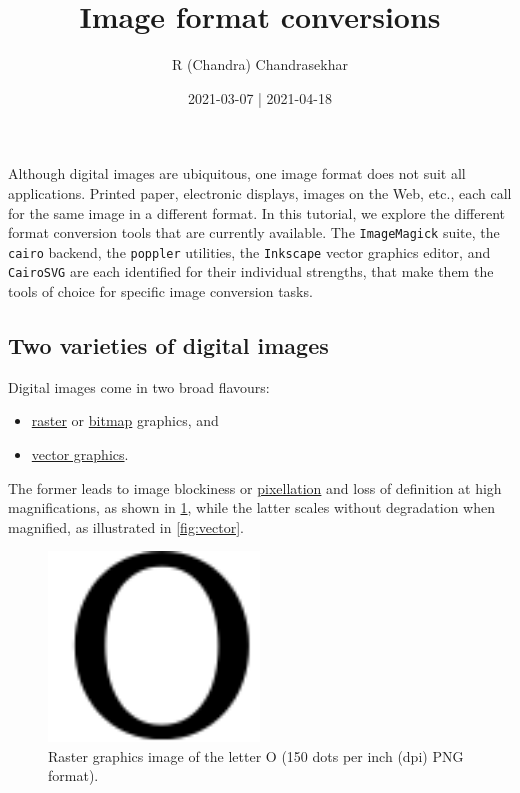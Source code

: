 \documentclass[
  11pt,
  british,
  a4paper,
]{article}
\title{Image format conversions}
\author{R (Chandra) Chandrasekhar}
\date{2021-03-07 | 2021-04-18}
\providecommand{\tightlist}{%
  \setlength{\itemsep}{0pt}\setlength{\parskip}{0pt}}
\begin{document}
\maketitle

\thispagestyle{empty}


Although digital images are ubiquitous, one image format does not suit
all applications. Printed paper, electronic displays, images on the Web,
etc., each call for the same image in a different format. In this
tutorial, we explore the different format conversion tools that are
currently available. The \texttt{ImageMagick} suite, the \texttt{cairo}
backend, the \texttt{poppler} utilities, the \texttt{Inkscape} vector
graphics editor, and \texttt{CairoSVG} are each identified for their
individual strengths, that make them the tools of choice for specific
image conversion tasks.

\hypertarget{two-varieties-of-digital-images}{%
\subsection{Two varieties of digital
images}\label{two-varieties-of-digital-images}}

Digital images come in two broad flavours:

\begin{itemize}
\tightlist
\item
  \href{https://en.wikipedia.org/wiki/Raster_graphics}{raster} or
  \href{https://en.wikipedia.org/wiki/Bitmap}{bitmap} graphics, and
\item
  \href{https://en.wikipedia.org/wiki/Vector_graphics}{vector graphics}.
\end{itemize}

The former leads to image blockiness or
\href{https://en.wikipedia.org/wiki/Pixelation}{pixellation} and loss of
definition at high magnifications, as shown in \cref{fig:raster}, while
the latter scales without degradation when magnified, as illustrated in
\cref{fig:vector}.

\begin{figure}
\hypertarget{fig:raster}{%
\centering
\includegraphics[width=0.5\textwidth,height=\textheight]{images/letter-O-150-dpi.png}
\caption{Raster graphics image of the letter O (150 dots per inch (dpi)
PNG format).}\label{fig:raster}
}
\end{figure}
\end{document}

